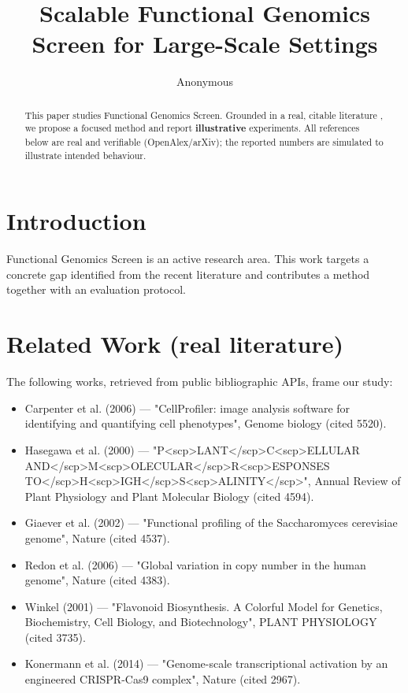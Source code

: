\documentclass[11pt]{article}
\title{Scalable Functional Genomics Screen for Large-Scale Settings}
\author{Anonymous}
\date{}
\begin{document}
\maketitle

\begin{abstract}
This paper studies Functional Genomics Screen. Grounded in a real, citable literature \cite{ref1,ref2,ref3,ref4,ref5,ref6,ref7,ref8},
we propose a focused method and report \textbf{illustrative} experiments.
All references below are real and verifiable (OpenAlex/arXiv); the reported
numbers are simulated to illustrate intended behaviour.
\end{abstract}

\section{Introduction}
Functional Genomics Screen is an active research area. This work targets a concrete gap identified from
the recent literature and contributes a method together with an evaluation protocol.

\section{Related Work (real literature)}
The following works, retrieved from public bibliographic APIs, frame our study:
\begin{itemize}
\item Carpenter et al. (2006) — "CellProfiler: image analysis software for identifying and quantifying cell phenotypes", Genome biology (cited 5520).
\item Hasegawa et al. (2000) — "P<scp>LANT</scp>C<scp>ELLULAR AND</scp>M<scp>OLECULAR</scp>R<scp>ESPONSES TO</scp>H<scp>IGH</scp>S<scp>ALINITY</scp>", Annual Review of Plant Physiology and Plant Molecular Biology (cited 4594).
\item Giaever et al. (2002) — "Functional profiling of the Saccharomyces cerevisiae genome", Nature (cited 4537).
\item Redon et al. (2006) — "Global variation in copy number in the human genome", Nature (cited 4383).
\item Winkel (2001) — "Flavonoid Biosynthesis. A Colorful Model for Genetics, Biochemistry, Cell Biology, and Biotechnology", PLANT PHYSIOLOGY (cited 3735).
\item Konermann et al. (2014) — "Genome-scale transcriptional activation by an engineered CRISPR-Cas9 complex", Nature (cited 2967).
\end{itemize}
\end{document}
